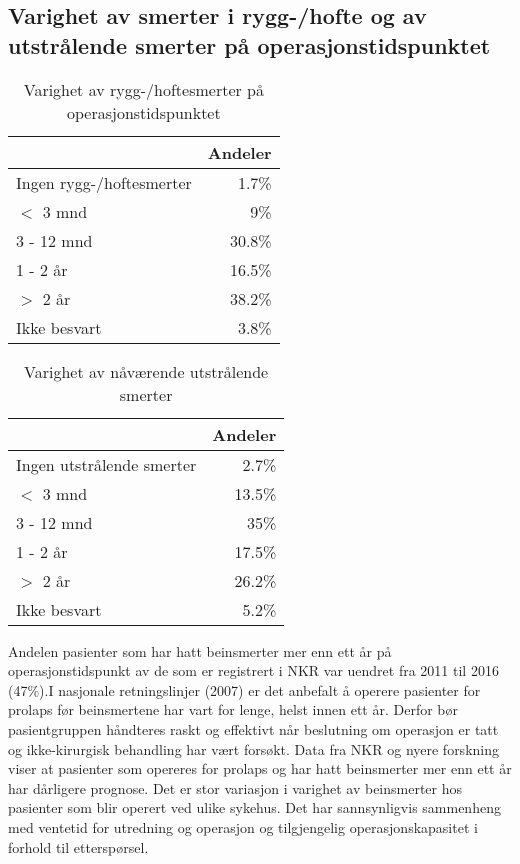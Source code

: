 \subsection{Varighet av smerter i rygg-/hofte og av utstrålende smerter på operasjonstidspunktet}

\begin{table}[ht]
\centering
\begin{tabular}{lr}
  \hline
 & Andeler \\ 
  \hline
Ingen rygg-/hoftesmerter & 1.7\% \\ 
  $<$ 3 mnd & 9\% \\ 
  3 - 12 mnd & 30.8\% \\ 
  1 - 2 år & 16.5\% \\ 
  $>$ 2 år & 38.2\% \\ 
  Ikke besvart & 3.8\% \\ 
   \hline
\end{tabular}
\caption{Varighet av rygg-/hoftesmerter på operasjonstidspunktet} 
\label{tab:SmRH}
\end{table}
\begin{table}[ht]
\centering
\begin{tabular}{lr}
  \hline
 & Andeler \\ 
  \hline
Ingen utstrålende smerter & 2.7\% \\ 
  $<$ 3 mnd & 13.5\% \\ 
  3 - 12 mnd & 35\% \\ 
  1 - 2 år & 17.5\% \\ 
  $>$ 2 år & 26.2\% \\ 
  Ikke besvart & 5.2\% \\ 
   \hline
\end{tabular}
\caption{Varighet av nåværende utstrålende smerter} 
\label{tab:Utstr}
\end{table}

Andelen pasienter som har hatt beinsmerter mer enn ett år på
operasjonstidspunkt av de som er registrert i NKR var uendret fra 2011 til 2016 (47\%).I nasjonale retningslinjer (2007) er det anbefalt å operere pasienter for prolaps før
beinsmertene har vart for lenge, helst innen ett år. Derfor bør
pasientgruppen håndteres raskt og effektivt når beslutning om operasjon er tatt og
ikke-kirurgisk behandling har vært forsøkt. Data fra NKR og nyere forskning viser at
pasienter som opereres for prolaps og har hatt beinsmerter mer enn ett år har
dårligere prognose. 
Det er stor variasjon i varighet av beinsmerter hos pasienter som blir
operert ved ulike sykehus. Det har sannsynligvis sammenheng med ventetid for
utredning og operasjon og tilgjengelig operasjonskapasitet i forhold til etterspørsel.

